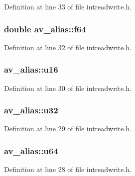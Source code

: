 Definition at line 33 of file intreadwrite.\+h.

\subsubsection[{\texorpdfstring{f64}{f64}}]{\setlength{\rightskip}{0pt plus 5cm}double av\+\_\+alias\+::f64}\hypertarget{unionav__alias_ad0906d74a615b1c9add8022e88d0a8ea}{}\label{unionav__alias_ad0906d74a615b1c9add8022e88d0a8ea}


Definition at line 32 of file intreadwrite.\+h.

\subsubsection[{\texorpdfstring{u16}{u16}}]{ av\+\_\+alias\+::u16}\hypertarget{unionav__alias_a79c01861a51e254641c99be17f8aa4f0}{}\label{unionav__alias_a79c01861a51e254641c99be17f8aa4f0}


Definition at line 30 of file intreadwrite.\+h.

\subsubsection[{\texorpdfstring{u32}{u32}}]{ av\+\_\+alias\+::u32}\hypertarget{unionav__alias_a98d19f5ed2320978bb0a25d387601b7d}{}\label{unionav__alias_a98d19f5ed2320978bb0a25d387601b7d}


Definition at line 29 of file intreadwrite.\+h.

\subsubsection[{\texorpdfstring{u64}{u64}}]{ av\+\_\+alias\+::u64}\hypertarget{unionav__alias_a6a73a59728e1b8d7d06123f5af4d59f7}{}\label{unionav__alias_a6a73a59728e1b8d7d06123f5af4d59f7}


Definition at line 28 of file intreadwrite.\+h.

